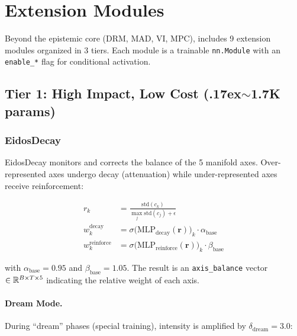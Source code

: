 
\section{Extension Modules}
\label{sec:extensions}

Beyond the epistemic core (DRM, MAD, VI, MPC), \aletheion{} includes
9 extension modules organized in 3 tiers. Each module is a trainable
\texttt{nn.Module} with an \texttt{enable\_*} flag for conditional
activation.

\subsection{Tier 1: High Impact, Low Cost ({\raise.17ex\hbox{$\scriptstyle\sim$}}1.7K params)}

\subsubsection{EidosDecay}
\label{sec:eidos}

EidosDecay monitors and corrects the balance of the 5 manifold axes.
Over-represented axes undergo decay (attenuation) while under-represented
axes receive reinforcement:

\begin{align}
    r_k &= \frac{\text{std}(c_k)}{\max_j \text{std}(c_j) + \epsilon} \label{eq:eidos_ratio} \\
    w_k^{\text{decay}} &= \sigma\big(\text{MLP}_{\text{decay}}(\bm{r})\big)_k \cdot \alpha_{\text{base}} \\
    w_k^{\text{reinforce}} &= \sigma\big(\text{MLP}_{\text{reinforce}}(\bm{r})\big)_k \cdot \beta_{\text{base}}
\end{align}

with $\alpha_{\text{base}} = 0.95$ and $\beta_{\text{base}} = 1.05$. The
result is an \texttt{axis\_balance} vector $\in \mathbb{R}^{B \times T \times 5}$
indicating the relative weight of each axis.

\paragraph{Dream Mode.} During ``dream'' phases (special training),
intensity is amplified by $\delta_{\text{dream}} = 3.0$:

